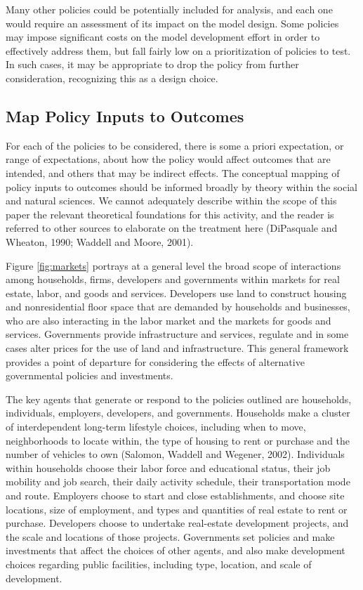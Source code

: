 Many other policies could be potentially included for analysis, and each one would require an assessment of its impact on the model design.  Some policies may impose significant costs on the model development effort in order to effectively address them, but fall fairly low on a prioritization of policies to test.  In such cases, it may be appropriate to drop the policy from further consideration, recognizing this as a design choice.

\subsection{Map Policy Inputs to Outcomes}

For each of the policies to be considered, there is some a priori expectation, or range of expectations, about how the policy would affect outcomes that are intended, and others that may be indirect effects.  The conceptual mapping of policy inputs to outcomes should be informed broadly by theory within the social and natural sciences.  We cannot adequately describe within the scope of this paper the relevant theoretical foundations for this activity, and the reader is referred to other sources to elaborate on the treatment here (DiPasquale and Wheaton, 1990; Waddell and Moore, 2001).

Figure \ref{fig:markets} portrays at a general level the broad scope of interactions among households, firms, developers and governments within markets for real estate, labor, and goods and services.  Developers use land to construct housing and nonresidential floor space that are demanded by households and businesses, who are also interacting in the labor market and the markets for goods and services.  Governments provide infrastructure and services, regulate and in some cases alter prices for the use of land and infrastructure.  This general framework provides a point of departure for considering the effects of alternative governmental policies and investments.

The key agents that generate or respond to the policies outlined are households, individuals, employers, developers, and governments. Households make a cluster of interdependent long-term lifestyle choices, including when to move, neighborhoods to locate within, the type of housing to rent or purchase and the number of vehicles to own (Salomon, Waddell and Wegener, 2002). Individuals within households choose their labor force and educational status, their job mobility and job search, their daily activity schedule, their transportation mode and route. Employers choose to start and close establishments, and choose site locations, size of employment, and types and quantities of real estate to rent or purchase. Developers choose to undertake real-estate development projects, and the scale and locations of those projects. Governments set policies and make investments that affect the choices of other agents, and also make development choices regarding public facilities, including type, location, and scale of development.

